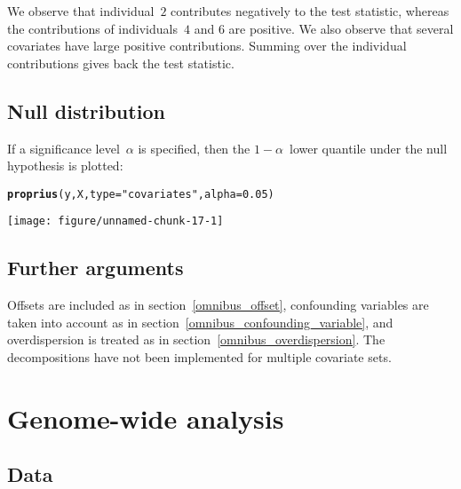 \documentclass{article}\usepackage[]{graphicx}\usepackage[]{color}
\makeatletter
\def\maxwidth{ %
  \ifdim\Gin@nat@width>\linewidth
    \linewidth
  \else
    \Gin@nat@width
  \fi
}
\newcommand{\hlnum}[1]{\textcolor[rgb]{0.686,0.059,0.569}{#1}}%
\newcommand{\hlstr}[1]{\textcolor[rgb]{0.192,0.494,0.8}{#1}}%
\newcommand{\hlstd}[1]{\textcolor[rgb]{0.345,0.345,0.345}{#1}}%
\newcommand{\hlkwc}[1]{\textcolor[rgb]{0.333,0.667,0.333}{#1}}%
\newcommand{\hlkwd}[1]{\textcolor[rgb]{0.737,0.353,0.396}{\textbf{#1}}}%
\newenvironment{kframe}{%
 \def\at@end@of@kframe{}%
 \ifinner\ifhmode%
  \def\at@end@of@kframe{\end{minipage}}%
  \begin{minipage}{\columnwidth}%
 \fi\fi%
 \def\FrameCommand##1{\hskip\@totalleftmargin \hskip-\fboxsep
 \colorbox{shadecolor}{##1}\hskip-\fboxsep
     \hskip-\linewidth \hskip-\@totalleftmargin \hskip\columnwidth}%
 \MakeFramed {\advance\hsize-\width
   \@totalleftmargin\z@ \linewidth\hsize
   \@setminipage}}%
 {\par\unskip\endMakeFramed%
 \at@end@of@kframe}
\newenvironment{knitrout}{}{} %
\makeatother
\begin{document}
We observe that individual~$2$ contributes negatively to the test statistic, whereas the contributions of individuals~$4$ and $6$ are positive. We also observe that several covariates have large positive contributions. Summing over the individual contributions gives back the test statistic.


\subsection{Null distribution}
\label{proprius_null_distribution}

If a significance level~$\alpha$ is specified, then the \mbox{$1-\alpha$}~lower quantile under the null hypothesis is plotted:
\begin{knitrout}
\color{fgcolor}\begin{kframe}
\begin{alltt}
\hlkwd{proprius}\hlstd{(y,X,}\hlkwc{type}\hlstd{=}\hlstr{"covariates"}\hlstd{,}\hlkwc{alpha}\hlstd{=}\hlnum{0.05}\hlstd{)}
\end{alltt}
\end{kframe}
\texttt{[image: figure/unnamed-chunk-17-1]} 

\end{knitrout}

\subsection{Further arguments}
\label{proprius_further_arguments}

Offsets are included as in section~\ref{omnibus_offset}, confounding variables are taken into account as in section~\ref{omnibus_confounding_variable}, and overdispersion is treated as in section~\ref{omnibus_overdispersion}. The decompositions have not been implemented for multiple covariate sets.

\newpage %
\section{Genome-wide analysis} %
\label{cursus} %

\subsection{Data}
\label{cursus_data}
\end{document}
